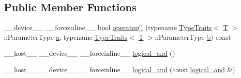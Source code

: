 \subsection*{Public Member Functions}
\begin{DoxyCompactItemize}
\item 
\-\_\-\-\_\-device\-\_\-\-\_\- \-\_\-\-\_\-forceinline\-\_\-\-\_\- bool \hyperlink{structcv_1_1gpu_1_1device_1_1logical__and_aee49fe010d327b3d54ad4a8b65b2f05b}{operator()} (typename \hyperlink{structcv_1_1gpu_1_1device_1_1TypeTraits}{Type\-Traits}$<$ \hyperlink{calib3d_8hpp_a3efb9551a871ddd0463079a808916717}{T} $>$\-::Parameter\-Type \hyperlink{legacy_8hpp_a1031d0e0a97a340abfe0a6ab9e831045}{a}, typename \hyperlink{structcv_1_1gpu_1_1device_1_1TypeTraits}{Type\-Traits}$<$ \hyperlink{calib3d_8hpp_a3efb9551a871ddd0463079a808916717}{T} $>$\-::Parameter\-Type \hyperlink{legacy_8hpp_ac04272e8ca865b8fba18d36edae9fd2a}{b}) const 
\item 
\-\_\-\-\_\-host\-\_\-\-\_\- \-\_\-\-\_\-device\-\_\-\-\_\- \-\_\-\-\_\-forceinline\-\_\-\-\_\- \hyperlink{structcv_1_1gpu_1_1device_1_1logical__and_a3051ed3b2d0238f83477fce3a5b10b3e}{logical\-\_\-and} ()
\item 
\-\_\-\-\_\-host\-\_\-\-\_\- \-\_\-\-\_\-device\-\_\-\-\_\- \-\_\-\-\_\-forceinline\-\_\-\-\_\- \hyperlink{structcv_1_1gpu_1_1device_1_1logical__and_aeaecf7259604b7691fb199f7e2aee1b3}{logical\-\_\-and} (const \hyperlink{structcv_1_1gpu_1_1device_1_1logical__and}{logical\-\_\-and} \&)
\end{DoxyCompactItemize}


